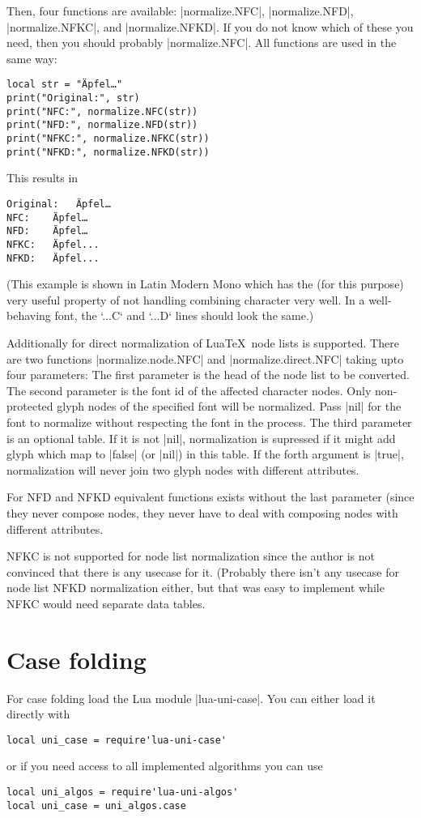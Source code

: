 \documentclass{article}
\begin{document}
Then, four functions are available: |normalize.NFC|, |normalize.NFD|, |normalize.NFKC|, and |normalize.NFKD|.
If you do not know which of these you need, then you should probably |normalize.NFC|. All functions are used in the same way:
\begin{verbatim}
local str = "Äpfel…"
print("Original:", str)
print("NFC:", normalize.NFC(str))
print("NFD:", normalize.NFD(str))
print("NFKC:", normalize.NFKC(str))
print("NFKD:", normalize.NFKD(str))
\end{verbatim}
This results in
\begin{verbatim}
Original:	Äpfel…
NFC:	Äpfel…
NFD:	Äpfel…
NFKC:	Äpfel...
NFKD:	Äpfel...
\end{verbatim}
(This example is shown in Latin Modern Mono which has the (for this purpose) very useful property of not handling combining character very well.
In a well-behaving font, the `...C` and `...D` lines should look the same.)

Additionally for direct normalization of Lua\TeX\ node lists is supported.
There are two functions |normalize.node.NFC| and |normalize.direct.NFC| taking upto four parameters: The first parameter is the head of the node list to be converted.
The second parameter is the font id of the affected character nodes. Only non-protected glyph nodes of the specified font will be normalized. Pass |nil| for the font
to normalize without respecting the font in the process. The third parameter is an optional table. If it is not |nil|, normalization is supressed if it might add glyph
which map to |false| (or |nil|) in this table. If the forth argument is |true|, normalization will never join two glyph nodes with different attributes.

For NFD and NFKD equivalent functions exists without the last parameter (since they never compose nodes, they never have to deal with composing nodes with different
attributes.

NFKC is not supported for node list normalization since the author is not convinced that there is any usecase for it. (Probably there isn't any usecase for node list
NFKD normalization either, but that was easy to implement while NFKC would need separate data tables.

\section{Case folding}
For case folding load the Lua module |lua-uni-case|.
You can either load it directly with
\begin{verbatim}
local uni_case = require'lua-uni-case'
\end{verbatim}
or if you need access to all implemented algorithms you can use
\begin{verbatim}
local uni_algos = require'lua-uni-algos'
local uni_case = uni_algos.case
\end{verbatim}
\end{document}
